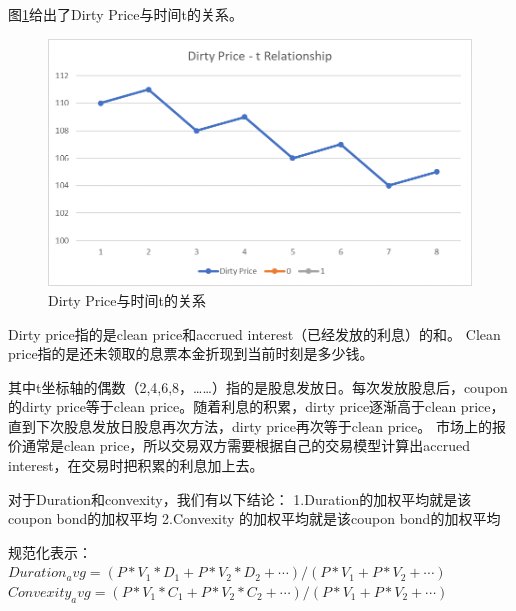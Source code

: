 图\ref{fig:sys.param}给出了Dirty Price与时间t的关系。
\begin{figure}[htbp]
\begin{center}
\includegraphics[width=16cm]{img//DirPri_t_Relation.PNG}
\caption{Dirty Price与时间t的关系}
\label{fig:sys.param}
\end{center}
\end{figure}

Dirty price指的是clean price和accrued interest（已经发放的利息）的和。
Clean price指的是还未领取的息票本金折现到当前时刻是多少钱。

其中t坐标轴的偶数（2,4,6,8，……）指的是股息发放日。每次发放股息后，coupon的dirty price等于clean price。随着利息的积累，dirty price逐渐高于clean price，直到下次股息发放日股息再次方法，dirty price再次等于clean price。
市场上的报价通常是clean price，所以交易双方需要根据自己的交易模型计算出accrued interest，在交易时把积累的利息加上去。

对于Duration和convexity，我们有以下结论：
1.Duration的加权平均就是该coupon bond的加权平均
2.Convexity 的加权平均就是该coupon bond的加权平均

规范化表示：
$Duration_avg=(P*V_1*D_1+P*V_2*D_2+ \cdots)/(P*V_1+P*V_2+\cdots)$
$Convexity_avg=(P*V_1*C_1+P*V_2*C_2+\cdots)/(P*V_1+P*V_2+\cdots)$

